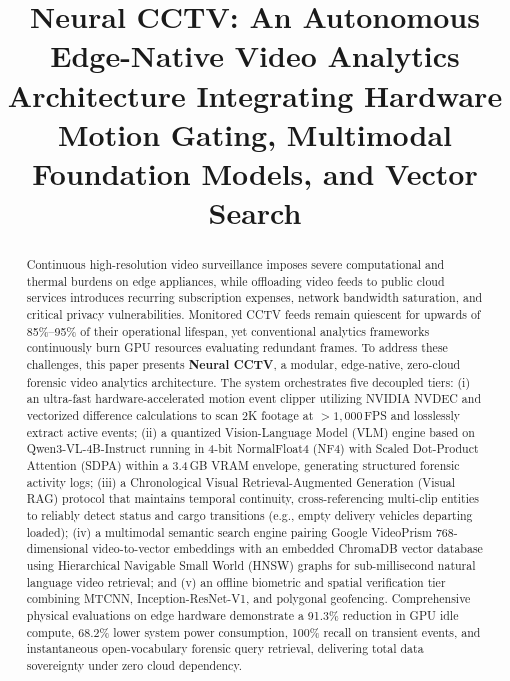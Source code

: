 \documentclass[10pt, conference]{IEEEtran}
\begin{document}
\title{Neural CCTV: An Autonomous Edge-Native Video Analytics Architecture Integrating Hardware Motion Gating, Multimodal Foundation Models, and Vector Search}

\author{
}

\maketitle

\begin{abstract}
Continuous high-resolution video surveillance imposes severe computational and thermal burdens on edge appliances, while offloading video feeds to public cloud services introduces recurring subscription expenses, network bandwidth saturation, and critical privacy vulnerabilities. Monitored CCTV feeds remain quiescent for upwards of 85\%--95\% of their operational lifespan, yet conventional analytics frameworks continuously burn GPU resources evaluating redundant frames. To address these challenges, this paper presents \textbf{Neural CCTV}, a modular, edge-native, zero-cloud forensic video analytics architecture. The system orchestrates five decoupled tiers: (i) an ultra-fast hardware-accelerated motion event clipper utilizing NVIDIA NVDEC and vectorized difference calculations to scan 2K footage at $>1,000$\,FPS and losslessly extract active events; (ii) a quantized Vision-Language Model (VLM) engine based on Qwen3-VL-4B-Instruct running in 4-bit NormalFloat4 (NF4) with Scaled Dot-Product Attention (SDPA) within a 3.4\,GB VRAM envelope, generating structured forensic activity logs; (iii) a Chronological Visual Retrieval-Augmented Generation (Visual RAG) protocol that maintains temporal continuity, cross-referencing multi-clip entities to reliably detect status and cargo transitions (e.g., empty delivery vehicles departing loaded); (iv) a multimodal semantic search engine pairing Google VideoPrism 768-dimensional video-to-vector embeddings with an embedded ChromaDB vector database using Hierarchical Navigable Small World (HNSW) graphs for sub-millisecond natural language video retrieval; and (v) an offline biometric and spatial verification tier combining MTCNN, Inception-ResNet-V1, and polygonal geofencing. Comprehensive physical evaluations on edge hardware demonstrate a 91.3\% reduction in GPU idle compute, 68.2\% lower system power consumption, 100\% recall on transient events, and instantaneous open-vocabulary forensic query retrieval, delivering total data sovereignty under zero cloud dependency.
\end{abstract}
\end{document}
